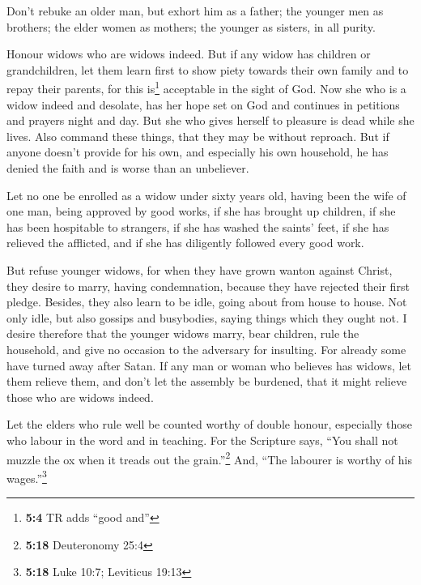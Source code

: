  Don't rebuke an older man, but exhort him as a father;
the younger men as brothers;  the elder women as mothers;
the younger as sisters, in all purity.

 Honour widows who are widows indeed.  But
if any widow has children or grandchildren, let them learn first to show
piety towards their own family and to repay their parents, for this
is\footnote{\textbf{5:4} TR adds ``good and''} acceptable in the sight
of God.  Now she who is a widow indeed and desolate, has
her hope set on God and continues in petitions and prayers night and
day.  But she who gives herself to pleasure is dead while
she lives.  Also command these things, that they may be
without reproach.  But if anyone doesn't provide for his
own, and especially his own household, he has denied the faith and is
worse than an unbeliever.

 Let no one be enrolled as a widow under sixty years old,
having been the wife of one man,  being approved by good
works, if she has brought up children, if she has been hospitable to
strangers, if she has washed the saints' feet, if she has relieved the
afflicted, and if she has diligently followed every good work.

 But refuse younger widows, for when they have grown
wanton against Christ, they desire to marry,  having
condemnation, because they have rejected their first pledge.
 Besides, they also learn to be idle, going about from
house to house. Not only idle, but also gossips and busybodies, saying
things which they ought not.  I desire therefore that the
younger widows marry, bear children, rule the household, and give no
occasion to the adversary for insulting.  For already
some have turned away after Satan.  If any man or woman
who believes has widows, let them relieve them, and don't let the
assembly be burdened, that it might relieve those who are widows indeed.

 Let the elders who rule well be counted worthy of double
honour, especially those who labour in the word and in teaching.
 For the Scripture says, ``You shall not muzzle the ox
when it treads out the grain.''\footnote{\textbf{5:18} Deuteronomy 25:4}
And, ``The labourer is worthy of his wages.''\footnote{\textbf{5:18}
  Luke 10:7; Leviticus 19:13}

